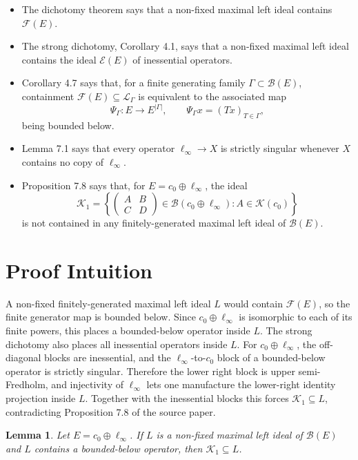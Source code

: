\documentclass[11pt]{article}
\newtheorem{lemma}{Lemma}
\newcommand{\B}{\mathscr{B}}
\newcommand{\F}{\mathscr{F}}
\newcommand{\K}{\mathscr{K}}
\newcommand{\E}{\mathscr{E}}
\begin{document}
\begin{itemize}
\item The dichotomy theorem says that a non-fixed maximal left ideal contains
  \(\F(E)\).
\item The strong dichotomy, Corollary 4.1, says that a non-fixed maximal left
  ideal contains the ideal \(\E(E)\) of inessential operators.
\item Corollary 4.7 says that, for a finite generating family
  \(\Gamma\subset \B(E)\), containment \(\F(E)\subseteq \mathscr{L}_\Gamma\)
  is equivalent to the associated map
  \[
    \Psi_\Gamma:E\to E^{|\Gamma|},\qquad
    \Psi_\Gamma x=(Tx)_{T\in\Gamma},
  \]
  being bounded below.
\item Lemma 7.1 says that every operator \(\ell_\infty\to X\) is strictly
  singular whenever \(X\) contains no copy of \(\ell_\infty\).
\item Proposition 7.8 says that, for \(E=c_0\oplus\ell_\infty\), the ideal
  \[
    \K_1=
      \left\{
      \begin{pmatrix}
      A & B\\ C & D
      \end{pmatrix}\in \B(c_0\oplus\ell_\infty):
      A\in\K(c_0)
      \right\}
  \]
  is not contained in any finitely-generated maximal left ideal of \(\B(E)\).
\end{itemize}

\section*{Proof Intuition}

A non-fixed finitely-generated maximal left ideal \(L\) would contain
\(\F(E)\), so the finite generator map is bounded below.  Since
\(c_0\oplus\ell_\infty\) is isomorphic to each of its finite powers, this
places a bounded-below operator inside \(L\).  The strong dichotomy also
places all inessential operators inside \(L\).  For \(c_0\oplus\ell_\infty\),
the off-diagonal blocks are inessential, and the \(\ell_\infty\)-to-\(c_0\)
block of a bounded-below operator is strictly singular.  Therefore the lower
right block is upper semi-Fredholm, and injectivity of \(\ell_\infty\) lets
one manufacture the lower-right identity projection inside \(L\).  Together
with the inessential blocks this forces \(\K_1\subseteq L\), contradicting
Proposition 7.8 of the source paper.

\begin{lemma}\label{lem:k1-forced}
Let \(E=c_0\oplus \ell_\infty\).  If \(L\) is a non-fixed maximal left ideal
of \(\B(E)\) and \(L\) contains a bounded-below operator, then
\(\K_1\subseteq L\).
\end{lemma}
\end{document}
